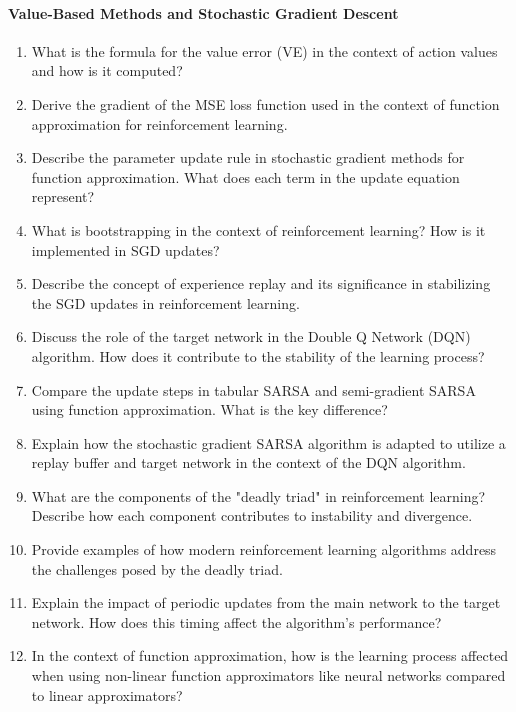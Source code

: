 \paragraph*{Value-Based Methods and Stochastic Gradient Descent}

\begin{enumerate}
	\item What is the formula for the value error (VE) in the context of action values and how is it computed?
    \item Derive the gradient of the MSE loss function used in the context of function approximation for reinforcement learning.
	\item Describe the parameter update rule in stochastic gradient methods for function approximation. What does each term in the update equation represent?
    \item What is bootstrapping in the context of reinforcement learning? How is it implemented in SGD updates?
    \item Describe the concept of experience replay and its significance in stabilizing the SGD updates in reinforcement learning.
    \item Discuss the role of the target network in the Double Q Network (DQN) algorithm. How does it contribute to the stability of the learning process?
    \item Compare the update steps in tabular SARSA and semi-gradient SARSA using function approximation. What is the key difference?
    \item Explain how the stochastic gradient SARSA algorithm is adapted to utilize a replay buffer and target network in the context of the DQN algorithm.
    \item What are the components of the "deadly triad" in reinforcement learning? Describe how each component contributes to instability and divergence.
    \item Provide examples of how modern reinforcement learning algorithms address the challenges posed by the deadly triad.
    \item Explain the impact of periodic updates from the main network to the target network. How does this timing affect the algorithm's performance?
    \item In the context of function approximation, how is the learning process affected when using non-linear function approximators like neural networks compared to linear approximators?
\end{enumerate}


